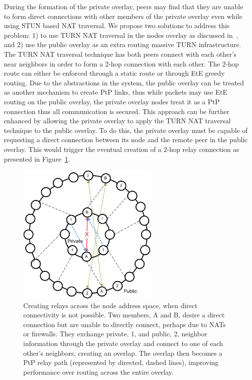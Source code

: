 \documentclass[conference]{IEEEtran}
\begin{document}
During the formation of the private overlay, peers may find that they are
unable to form direct connections with other members of the private overlay
even while using STUN based NAT traversal.  
We propose two solutions to address this problem: 1) to use TURN NAT traversal 
in the nodes overlay as discussed
in~\cite{nsdi10}, and 2) use the public overlay as an extra routing massive TURN
infrastructure.  The TURN NAT traversal technique has both peers connect with
each other's near neighbors in order to form a 2-hop connection with each other.
The 2-hop route can either be enforced through a static route or through EtE
greedy routing.  Due to the abstractions in the system, the public overlay can
be treated as another mechanism to create PtP links, thus while packets may use
EtE routing on the public overlay, the private overlay nodes treat it as a PtP
connection thus all communication is secured.  This approach can be further
enhanced by allowing the private overlay to apply the TURN NAT traversal
technique to the public overlay.  To do this, the private overlay must be
capable of requesting a direct connection between its node and the remote
peer in the public overlay.  This would trigger the eventual creation of a 2-hop
relay connection as presented in Figure~\ref{fig:overlay_relay}.

\begin{figure}[h]
\centering
\includegraphics[width=2.75in]{subring_tunnel.eps}
\caption{Creating relays across the node address space, when direct
connectivity is not possible.  Two members, A and B, desire a direct connection
but are unable to directly connect, perhaps due to NATs or firewalls.  They
exchange private, 1, and public, 2, neighbor information through the private
overlay and connect to one of each other's neighbors, creating an overlap.  The
overlap then becomes a PtP relay path (represented by directed, dashed lines),
improving performance over routing across the entire overlay.}
\label{fig:overlay_relay}
\end{figure}
\end{document}
